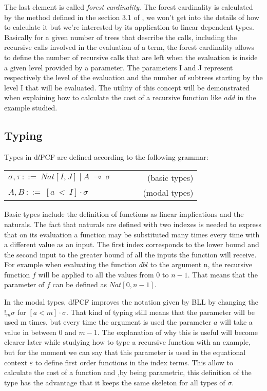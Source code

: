 \documentclass[a4paper,12pt]{article}
\begin{document}
The last element is called \emph{forest cardinality}. The forest
cardinality is calculated by the method defined in the section 3.1 of \cite{ldtcbv}, we won't
get into the details of how to calculate it but we're interested by its application to 
linear dependent types. Basically for a given number of trees that describe the calls, including
the recursive calls involved in the evaluation of a term, the forest cardinality allows to
define the number of recursive calls that are left when the evaluation is inside a given
level provided by a parameter. The parameters I and J represent respectively the level of the 
evaluation and the number of subtrees starting by the level I that will be evaluated. The 
utility of this concept will be demonstrated when explaining how to calculate the cost of
a recursive function like $add$ in the example studied.


\subsection{Typing}

Types in d$l$PCF are defined according to the following grammar:

\begin{center}
  \begin{tabular}{l c r}
    $\sigma, \tau~::=~Nat[I,J]~|~A~\multimap~\sigma$ & ~~~~ & (basic types) \\
    $A, B~::=~[a~<~I] \cdot \sigma$ & ~~~~ & (modal types)
  \end{tabular}
\end{center}

Basic types include the definition of functions as linear implications
and the naturals. The fact that naturals are defined with two indexes
is needed to express that on its evaluation a function may be
substituted many times every time with a different value as an
input. The first index corresponds to the lower bound and the second
input to the greater bound of all the inputs the function will
receive. For example when evaluating the function $dbl$ to the
argument n, the recursive function $f$ will be applied to all the
values from $0$ to $n-1$. That means that the parameter of $f$ can be
defined as $Nat[0,n-1]$.

In the modal types, d$l$PCF improves the notation given by BLL by changing the 
$!_{m}\sigma$ for $[a < m] \cdot \sigma$. That kind of typing still means that 
the parameter will be used m times, but every time the argument is used
the parameter $a$ will take a value in between 0 and $m-1$. The
explanation of why this is useful will become clearer later
while studying how to type a recursive function with an example, but 
for the moment we can say that this parameter is used in 
the equational context $\varepsilon$ to define first order functions
in the index terms. This allow to calculate the cost of a function and
,by being parametric, this definition of the type has the advantage
that it keeps the same skeleton for all types of $\sigma$.
\end{document}
